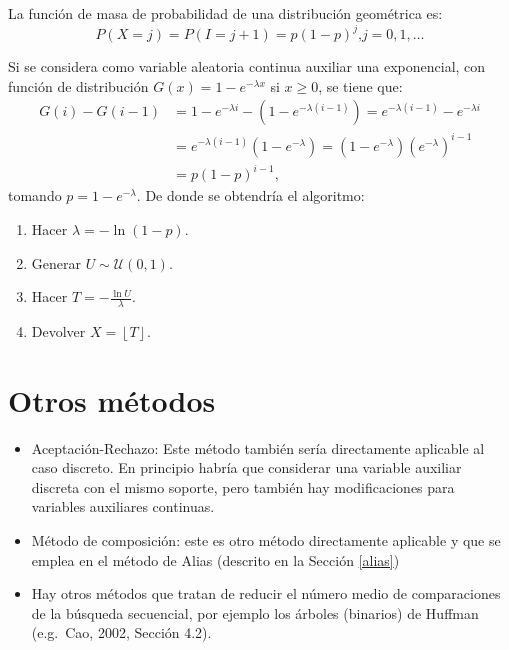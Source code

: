 \documentclass[
]{book}
\theoremstyle{break}
\theoremstyle{definition}
\theoremstyle{definition}
\theoremstyle{definition}
\theoremstyle{remark}
\let\BeginKnitrBlock\begin \let\EndKnitrBlock\end
\begin{document}
\BeginKnitrBlock{example}[distribución geométrica]
\protect\hypertarget{exm:unnamed-chunk-24}{}{\label{exm:unnamed-chunk-24} {} }
\EndKnitrBlock{example}

La función de masa de probabilidad de una distribución geométrica es:
\[P\left( X=j\right)  =P\left( I=j+1\right)  =p\left( 1-p\right)^{j}\text{,
}j=0,1,\ldots\]

Si se considera como variable aleatoria continua auxiliar una
exponencial, con función de distribución
\(G\left( x\right) = 1-e^{-\lambda x}\) si \(x\geq0\),
se tiene que:
\[\begin{aligned}
G\left( i\right) - G\left( i-1\right)   
& = 1-e^{-\lambda i}-\left(1-e^{-\lambda\left( i-1\right) }\right)  
= e^{-\lambda\left( i-1\right)}-e^{-\lambda i}\\
& = e^{-\lambda\left( i-1\right)  }\left( 1-e^{-\lambda}\right)  
= \left( 1-e^{-\lambda}\right)  \left( e^{-\lambda}\right)^{i-1} \\
& = p\left(1-p\right)^{i-1},
\end{aligned}\]
tomando \(p=1-e^{-\lambda}\).
De donde se obtendría el algoritmo:

\begin{enumerate}
\def\labelenumi{\arabic{enumi}.}
\setcounter{enumi}{-1}
\item
  Hacer \(\lambda=-\ln\left( 1-p\right)\).
\item
  Generar \(U\sim \mathcal{U}\left( 0,1\right)\).
\item
  Hacer \(T=-\frac{\ln U}{\lambda}\).
\item
  Devolver \(X=\left\lfloor T\right\rfloor\).
\end{enumerate}

\hypertarget{otros-muxe9todos}{%
\section{Otros métodos}\label{otros-muxe9todos}}

\begin{itemize}
\item
  Aceptación-Rechazo: Este método también sería directamente aplicable al
  caso discreto. En principio habría que considerar una variable
  auxiliar discreta con el mismo soporte, pero también hay modificaciones
  para variables auxiliares continuas.
\item
  Método de composición: este es otro método directamente aplicable y
  que se emplea en el método de Alias (descrito en la Sección \ref{alias})
\item
  Hay otros métodos que tratan de reducir el número medio de comparaciones
  de la búsqueda secuencial, por ejemplo los árboles (binarios) de Huffman
  (e.g.~Cao, 2002, Sección 4.2).
\end{itemize}
\end{document}

